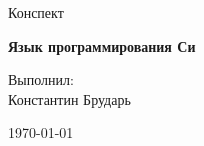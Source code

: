 \begin{titlepage}
    \centering

    \vspace*{\fill}

    {\LARGE Конспект}

    {\Huge\bfseries Язык программирования Си}

    \vfill

    \hfill \begin{minipage}{0.5\textwidth}
        \begin{flushleft}
            Выполнил: \\
            Константин Брударь
        \end{flushleft}
    \end{minipage}

    \vfill

    {\large \today}
\end{titlepage}
